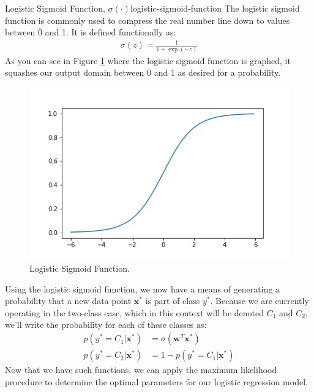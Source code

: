 \begin{definition}{Logistic Sigmoid Function, $\sigma(\cdot)$}{logistic-sigmoid-function}
	The logistic sigmoid function is commonly used to compress the real number line down to values between 0 and 1. It is defined functionally as:
	\begin{align*}
		\sigma(z) = \frac{1}{1 + \exp{(-z)}}
	\end{align*}
	As you can see in Figure \ref{fig:log-sig-fn} where the logistic sigmoid function is graphed, it squashes our output domain between 0 and 1 as desired for a probability.
\end{definition}

\begin{figure}
    \centering
    \includegraphics[width=0.5\paperwidth]{../Classification/fig/log_sig_fn_GEN.jpg}
    \caption{Logistic Sigmoid Function.}
    \label{fig:log-sig-fn}
\end{figure}


Using the logistic sigmoid function, we now have a means of generating a probability that a new data point $\textbf{x}^{*}$ is part of class $y^{*}$. Because we are currently operating in the two-class case, which in this context will be denoted $C_{1}$ and $C_{2}$, we'll write the probability for each of these classes as:
\begin{align*}
	p(y^{*}=C_{1}|\textbf{x}^{*}) &= \sigma(\textbf{w}^{T}\textbf{x}^{*}) \\
	p(y^{*}=C_{2}|\textbf{x}^{*}) &= 1 - p(y^{*}=C_{1}|\textbf{x}^{*})
\end{align*}
Now that we have such functions, we can apply the maximum likelihood procedure to determine the optimal parameters for our logistic regression model.

